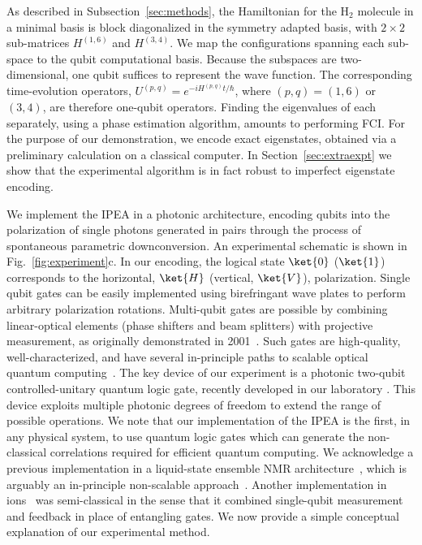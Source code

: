 \documentclass[11pt,oneside,final]{huthesis}%
\begin{document}
As described in Subsection~\ref{sec:methods}, the Hamiltonian for the H$_2$ molecule in a minimal basis 
is block diagonalized in the symmetry adapted basis, with $2\times 2$ sub-matrices 
${H}^{(1,6)}$ and ${H}^{(3,4)}$. We map the configurations spanning each 
sub-space to the qubit 
computational basis. Because the subspaces are two-dimensional, one qubit suffices to represent 
the wave function. The corresponding time-evolution operators, 
${U}^{(p,q)}=e^{-i{H}^{(p,q)}t/\hbar}$, where $(p,q)=(1,6)$ or $(3,4)$, 
are therefore one-qubit operators. Finding the 
eigenvalues of each separately, using a phase estimation algorithm, amounts to performing FCI.
For the purpose of our demonstration, we encode exact eigenstates, obtained via a preliminary 
calculation on a classical computer.
In Section~\ref{sec:extraexpt} we show that the experimental algorithm is in fact robust to imperfect eigenstate encoding.

We implement the IPEA in a photonic architecture, encoding qubits into the polarization of single 
photons generated in pairs through the process of spontaneous parametric downconversion. An 
experimental schematic is shown in Fig.~\ref{fig:experiment}c. In our encoding, the logical state 
$\ket{0}$ ($\ket{1}$) corresponds to the horizontal, $\ket{H}$ (vertical, $\ket{V}$), polarization. 
Single qubit gates can be easily implemented using birefringant wave plates to perform arbitrary 
polarization rotations. Multi-qubit gates are possible by combining linear-optical elements 
(phase shifters and beam splitters) with projective measurement, as originally demonstrated in 
2001~\cite{Obrien03, Knill01}. Such gates are high-quality, well-characterized, and have several 
in-principle paths to scalable optical quantum computing~\cite{Kok07}. The key device of our 
experiment is a photonic two-qubit controlled-unitary quantum logic gate, recently developed in 
our laboratory \cite{Lanyon09}. This device exploits multiple photonic degrees of 
freedom to extend the range of possible operations.
We note that our implementation of the IPEA is the first, in any physical system, to use quantum 
logic gates which can generate the non-classical correlations required for efficient quantum 
computing. We acknowledge a previous implementation in a liquid-state ensemble NMR 
architecture~\cite{Xiu07}, which is arguably an in-principle non-scalable approach~\cite{Braunstein99}. Another implementation in ions~\cite{Chiaverini05} was semi-classical in the 
sense that it combined single-qubit measurement and feedback in place of entangling gates. 
We now provide a simple conceptual explanation of our experimental method.
\end{document}
